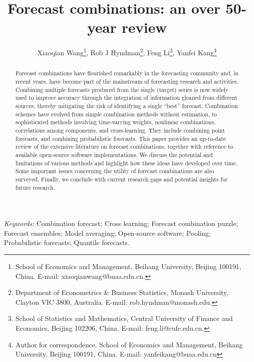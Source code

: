 \documentclass[a4paper,11pt]{article}
\begin{document}
\def\spacingset#1{\renewcommand{\baselinestretch}%
  {#1}\small\normalsize} \spacingset{1.25}

\title{\bf
  Forecast combinations: an over 50-year review
}

\author{Xiaoqian Wang\footnote{School of Economics and Management, Beihang University,
    Beijing 100191, China. E-mail: xiaoqianwang@buaa.edu.cn.},\quad
  Rob J Hyndman\footnote{Department of Econometrics \& Business Statistics, Monash University,
    Clayton VIC 3800, Australia. E-mail: rob.hyndman@monash.edu.},\quad
  Feng Li\footnote{School of Statistics and Mathematics, Central University of Finance and Economics,
    Beijing 102206, China. E-mail: feng.li@cufe.edu.cn.},\quad
  Yanfei Kang\footnote{Author for correspondence. School of Economics and Management, Beihang University,
    Beijing 100191, China. E-mail: yanfeikang@buaa.edu.cn}}

\maketitle

\bigskip
\begin{abstract}
  Forecast combinations have flourished remarkably in the forecasting community and, in recent years, have become part of the mainstream of forecasting research and activities. Combining multiple forecasts produced from the single (target) series is now widely used to improve accuracy through the integration of information gleaned from different sources, thereby mitigating the risk of identifying a single ``best'' forecast. Combination schemes have evolved from simple combination methods without estimation, to sophisticated methods involving time-varying weights, nonlinear combinations, correlations among components, and cross-learning. They include combining point forecasts, and combining probabilistic forecasts. This paper provides an up-to-date review of the extensive literature on forecast combinations, together with reference to available open-source software implementations. We discuss the potential and limitations of various methods and highlight how these ideas have developed over time. Some important issues concerning the utility of forecast combinations are also surveyed. Finally, we conclude with current research gaps and potential insights for future research.
\end{abstract}

\noindent%
\textit{Keywords:}
  Combination forecast;
  Cross learning;
  Forecast combination puzzle;
  Forecast ensembles;
  Model averaging;
  Open-source software;
  Pooling;
  Probabilistic forecasts;
  Quantile forecasts.
\vfill
\end{document}
